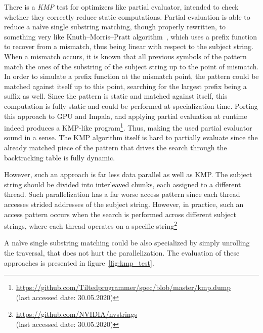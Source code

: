 There is a \emph{KMP} test for optimizers like partial evaluator, 
intended to check whether they correctly reduce static computations. 
Partial evaluation is able to reduce a na\`ive single substring matching, 
though properly rewritten, to something very like Knuth--Morris--Pratt algorithm~\cite{KMP-Danvy}, 
which uses a prefix function to recover from a mismatch, thus being linear with 
respect to the subject string.
When a mismatch occurs, it is known that all previous symbols of the pattern 
match the ones of the substring of the subject string up to the point of mismatch. 
In order to simulate a prefix function at the mismatch point, the pattern could be 
matched against itself up to this point, searching for the largest prefix being a 
suffix as well.
Since the pattern is static and matched against itself, this computation is fully static 
and could be performed at specialization time.
Porting this approach to GPU and Impala, and applying partial evaluation 
at runtime indeed produces a KMP-like program\footnote{\url{https://github.com/Tiltedprogrammer/spec/blob/master/kmp.dump}\\ (last accessed date: 30.05.2020)}. 
Thus, making the used partial evaluator sound in a sense. The KMP algorithm itself is hard to partially evaluate since the already matched piece of the pattern 
that drives the search through the backtracking table is fully dynamic.

However, such an approach is far less data parallel as well as KMP. The subject 
string should be divided into interleaved chunks, each assigned to a different 
thread. Such parallelization has a far worse access pattern since each 
thread accesses strided addresses of the subject string. 
However, in practice, such an access pattern occurs when the search is performed 
across different subject strings, where each thread operates on a 
specific string\footnote{\url{https://github.com/NVIDIA/nvstrings} \\(last accessed date: 30.05.2020)}

A na\`ive single substring matching could be also specialized by simply unrolling 
the traversal, that does not hurt the parallelization. 
The evaluation of these approaches is presented in figure~\ref{fig:kmp_test}.

